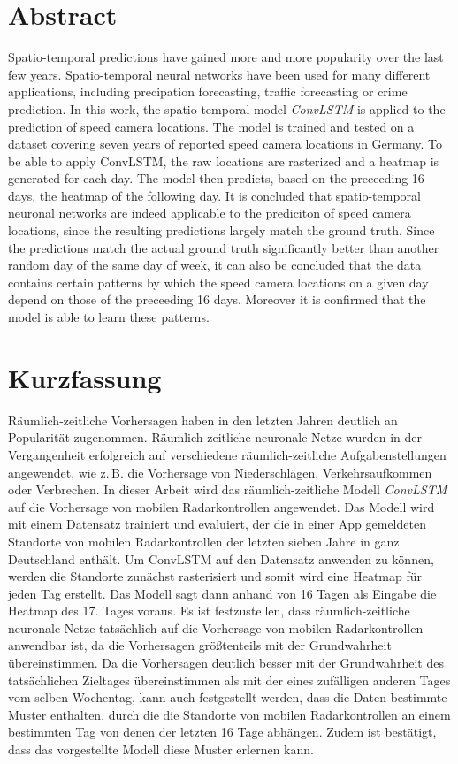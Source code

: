 \section*{Abstract}
Spatio-temporal predictions have gained more and more popularity over the last few years.
Spatio-temporal neural networks have been used for many different applications,
including precipation forecasting, traffic forecasting or crime prediction.
In this work, the spatio-temporal model \emph{ConvLSTM} is applied to the prediction of speed camera locations.
The model is trained and tested on a dataset covering seven years of reported speed camera locations in Germany.
To be able to apply ConvLSTM, the raw locations are rasterized and a heatmap is generated for each day.
The model then predicts, based on the preceeding 16 days, the heatmap of the following day.
It is concluded that spatio-temporal neuronal networks are indeed applicable to the prediciton of speed camera locations, since the resulting predictions largely match the ground truth.
Since the predictions match the actual ground truth significantly better than another random day of the same day of week, it can also be concluded that the data contains certain patterns by which the speed camera locations on a given day depend on those of the preceeding 16 days.
Moreover it is confirmed that the model is able to learn these patterns.

\section*{Kurzfassung}
Räumlich-zeitliche Vorhersagen haben in den letzten Jahren deutlich an Popularität zugenommen.
Räumlich-zeitliche neuronale Netze wurden in der Vergangenheit erfolgreich auf verschiedene räumlich-zeitliche Aufgabenstellungen angewendet, wie z.\,B. die Vorhersage von Niederschlägen, Verkehrsaufkommen oder Verbrechen.
In dieser Arbeit wird das räumlich-zeitliche Modell \emph{ConvLSTM} auf die Vorhersage von mobilen Radarkontrollen angewendet.
Das Modell wird mit einem Datensatz trainiert und evaluiert, der die in einer App gemeldeten Standorte von mobilen Radarkontrollen der letzten sieben Jahre in ganz Deutschland enthält.
Um ConvLSTM auf den Datensatz anwenden zu können, werden die Standorte zunächst rasterisiert und somit wird eine Heatmap für jeden Tag erstellt.
Das Modell sagt dann anhand von 16 Tagen als Eingabe die Heatmap des 17. Tages voraus.
Es ist festzustellen, dass räumlich-zeitliche neuronale Netze tatsächlich auf die Vorhersage von mobilen Radarkontrollen anwendbar ist, da die Vorhersagen größtenteils mit der Grundwahrheit übereinstimmen.
Da die Vorhersagen deutlich besser mit der Grundwahrheit des tatsächlichen Zieltages übereinstimmen als mit der eines zufälligen anderen Tages vom selben Wochentag, kann auch festgestellt werden, dass die Daten bestimmte Muster enthalten, durch die die Standorte von mobilen Radarkontrollen an einem bestimmten Tag von denen der letzten 16 Tage abhängen.
Zudem ist bestätigt, dass das vorgestellte Modell diese Muster erlernen kann.

